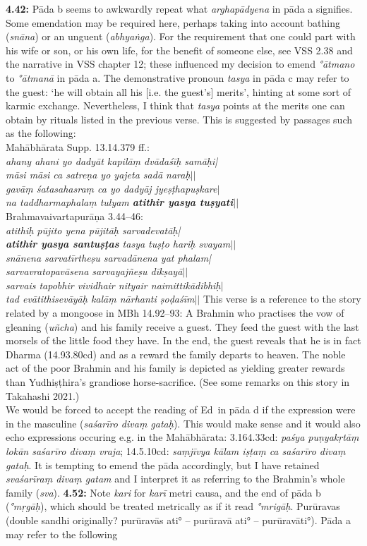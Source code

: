 \documentclass{article}
\newcommand{\vsnum}[1]{\textbf{#1}}
\newcommand{\skt}[1]{\textit{#1}}
\newcommand{\Ed}{Ed}
\begin{document}
\vsnum{4.42: }Pāda b seems to awkwardly repeat what \skt{arghapādyena} in pāda a signifies. Some emendation may be required here, perhaps taking into account bathing (\skt{snāna}) or an unguent (\skt{abhyaṅga}). For the requirement that one could part with his wife or son, or his own life, for the benefit of someone else, see VSS 2.38 and the narrative in VSS chapter 12; these influenced my decision to emend \skt{°ātmano} to \skt{°ātmanā} in pāda a. The demonstrative pronoun \skt{tasya} in pāda c may refer to the guest: `he will obtain all his [i.e. the guest's] merits', hinting at some sort of karmic exchange. Nevertheless, I think that \skt{tasya} points at the merits one can obtain by rituals listed in the previous verse. This is suggested by passages such as the following: \\ Mahābhārata Supp. 13.14.379 ff.:\\ \textit{ahany ahani yo dadyāt kapilāṃ dvādaśīḥ samāḥi|\\ māsi māsi ca satreṇa yo yajeta sadā naraḥ$||$ \\ gavāṃ śatasahasraṃ ca yo dadyāj jyeṣṭhapuṣkare$|$\\ na taddharmaphalaṃ tulyam \textbf{atithir yasya tuṣyati}$||$} \\ Brahmavaivartapurāṇa 3.44--46:\\ \textit{atithiḥ pūjito yena pūjitāḥ sarvadevatāḥ|\\ \textbf{atithir yasya santuṣṭas} tasya tuṣṭo hariḥ svayam$||$\\ snānena sarvatīrtheṣu sarvadānena yat phalam|\\ sarvavratopavāsena sarvayajñeṣu dīkṣayā$||$ \\ sarvais tapobhir vividhair nityair naimittikādibhiḥ$|$\\ tad evātithisevāyāḥ kalāṃ nārhanti ṣoḍaśīm$||$}  This verse is a reference to the story related by a mongoose in MBh 14.92--93: A Brahmin who practises the vow of gleaning (\skt{uñcha}) and his family receive a guest. They feed the guest with the last morsels of the little food they have. In the end, the guest reveals that he is in fact Dharma (14.93.80cd) and as a reward the family departs to heaven. The noble act of the poor Brahmin and his family is depicted as yielding greater rewards than Yudhiṣṭhira's grandiose horse-sacrifice. (See some remarks on this story in Takahashi 2021.) \\We would be forced to accept the reading of \Ed\ in pāda d if the expression were in the masculine (\skt{saśarīro divaṃ gataḥ}). This would make sense and it would also echo expressions occuring e.g. in the Mahābhārata: 3.164.33cd: \textit{paśya puṇyakṛtāṃ lokān saśarīro divaṃ vraja}; 14.5.10cd: \textit{saṃjīvya kālam iṣṭaṃ ca saśarīro divaṃ gataḥ}. It is tempting to emend the pāda accordingly, but I have retained \skt{svaśarīraṃ divaṃ gatam} and I interpret it as referring to the Brahmin's whole family (\skt{sva}).  \vsnum{4.52: }Note \skt{kari} for \skt{karī} metri causa, and the end of pāda b (\skt{°mṛgāḥ}), which should be treated metrically as if it read \skt{°mrigāḥ}. Purūravas (double sandhi originally? purūravās ati° -- purūravā ati° -- purūravāti°). Pāda a may refer to the following 
\end{document}
